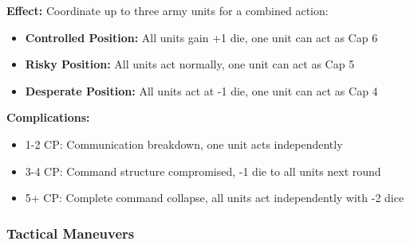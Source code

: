 \textbf{Effect:} Coordinate up to three army units for a combined action:
\begin{itemize}[leftmargin=*]
    \item \textbf{Controlled Position:} All units gain +1 die, one unit can act as Cap 6
    \item \textbf{Risky Position:} All units act normally, one unit can act as Cap 5
    \item \textbf{Desperate Position:} All units act at -1 die, one unit can act as Cap 4
\end{itemize}

\textbf{Complications:}
\begin{itemize}[leftmargin=*]
    \item 1-2 CP: Communication breakdown, one unit acts independently
    \item 3-4 CP: Command structure compromised, -1 die to all units next round
    \item 5+ CP: Complete command collapse, all units act independently with -2 dice
\end{itemize}

\subsubsection{Tactical Maneuvers}

